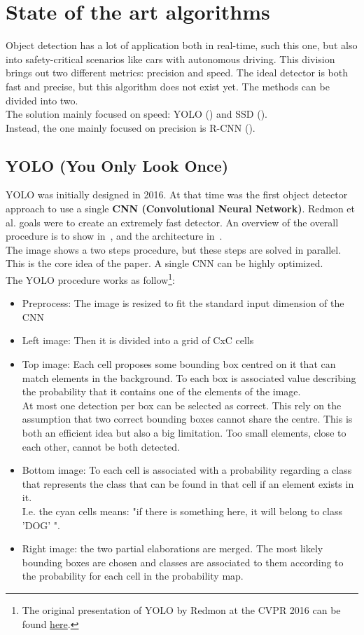 \section{State of the art algorithms}
Object detection has a lot of application both in real-time, such this one, but also into safety-critical scenarios like cars with autonomous driving. This division brings out two different metrics: precision and speed. The ideal detector is both fast and precise, but this algorithm does not exist yet. The methods can be divided into two.\\
The solution mainly focused on speed: YOLO () and SSD ().\\
Instead, the one mainly focused on precision is R-CNN ().


\subsection{YOLO (You Only Look Once)} \label{sec:yolo}
YOLO\cite{yolo} was initially designed in 2016. At that time was the first object detector approach to use a single \textbf{CNN (Convolutional Neural Network)}. Redmon et al. goals were to create an extremely fast detector. An overview of the overall procedure is to show in~, and the architecture in~.\\
The image shows a two steps procedure, but these steps are solved in parallel. This is the core idea of the paper. A single CNN can be highly optimized.\\
The YOLO procedure works as follow\footnote{The original presentation of YOLO by Redmon at the CVPR 2016 can be found \href{https://www.youtube.com/watch?v=NM6lrxy0bxs}{here}.}:
\begin{itemize}
	\item Preprocess: The image is resized to fit the standard input dimension of the CNN
	\item Left image: Then it is divided into a grid of CxC cells
	\item Top image: Each cell proposes some bounding box centred on it that can match elements in the background. To each box is associated value describing the probability that it contains one of the elements of the image.\\
	At most one detection per box can be selected as correct. This rely on the assumption that two correct bounding boxes cannot share the centre. This is both an efficient idea but also a big limitation. Too small elements, close to each other, cannot be both detected.
	\item Bottom image: To each cell is associated with a probability regarding a class that represents the class that can be found in that cell if an element exists in it.\\
	I.e. the cyan cells means: "if there is something here, it will belong to class 'DOG' ".
	\item Right image: the two partial elaborations are merged. The most likely bounding boxes are chosen and classes are associated to them according to the probability for each cell in the probability map.
\end{itemize}


